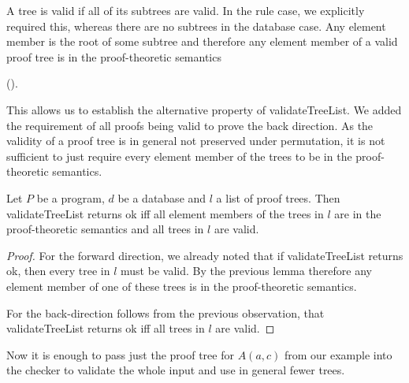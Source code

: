 A tree is valid if all of its subtrees are valid. In the rule case, we explicitly required this, whereas there are no subtrees in the database case. Any element member is the root of some subtree and therefore any element member of a valid proof tree is in the proof-theoretic semantics 

(\allTreeElementsOfValidTreeInSemantics).

This allows us to establish the alternative property of validateTreeList. We added the requirement of all proofs being valid to prove the back direction. As the validity of a proof tree is in general not preserved under permutation, it is not sufficient to just require every element member of the trees to be in the proof-theoretic semantics.

\begin{lemma}[\validateTreeListUnitIffSubsetSemanticsAndAllValid]
    Let $P$ be a program, $d$ be a database and $l$ a list of proof trees. Then validateTreeList returns ok iff all element members of the trees in $l$ are in the proof-theoretic semantics and all trees in $l$ are valid.
\end{lemma}
\begin{proof}
    For the forward direction, we already noted that if validateTreeList returns ok, then every tree in $l$ must be valid. By the previous lemma therefore any element member of one of these trees is in the proof-theoretic semantics.

    For the back-direction follows from the previous observation, that validateTreeList returns ok iff all trees in $l$ are valid.
\end{proof}

Now it is enough to pass just the proof tree for $A(a,c)$ from our example into the checker to validate the whole input and use in general fewer trees. 
